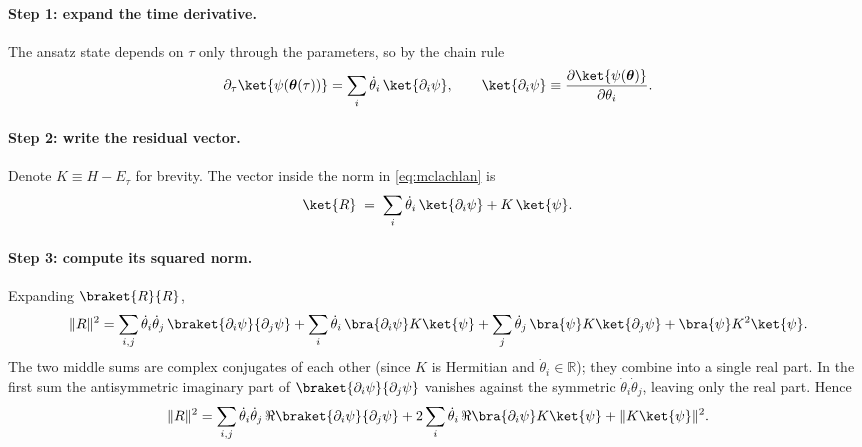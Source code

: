 \paragraph{Step 1: expand the time derivative.}
The ansatz state depends on $\tau$ only through the parameters, so by
the chain rule
\begin{equation}
  \label{eq:dtau_psi}
  \partial_\tau\ket{\psi(\bm{\theta}(\tau))}
  = \sum_i \dot{\theta}_i\,\ket{\partial_i\psi},
  \qquad
  \ket{\partial_i\psi} \equiv \frac{\partial\ket{\psi(\bm{\theta})}}
                                   {\partial\theta_i}.
\end{equation}

\paragraph{Step 2: write the residual vector.}
Denote $K \equiv H - E_\tau$ for brevity. The vector inside the norm in
\cref{eq:mclachlan} is
\begin{equation}
  \label{eq:residual}
  \ket{R} \;=\; \sum_i \dot{\theta}_i\,\ket{\partial_i\psi}
                + K\,\ket{\psi}.
\end{equation}

\paragraph{Step 3: compute its squared norm.}
Expanding $\braket{R}{R}$,
\begin{equation*}
  \|R\|^{2} =
    \sum_{i,j}\dot{\theta}_i\dot{\theta}_j\,
       \braket{\partial_i\psi}{\partial_j\psi}
    + \sum_i \dot{\theta}_i\,\bra{\partial_i\psi}K\ket{\psi}
    + \sum_j \dot{\theta}_j\,\bra{\psi}K\ket{\partial_j\psi}
    + \bra{\psi}K^{2}\ket{\psi}.
\end{equation*}
The two middle sums are complex conjugates of each other (since $K$ is
Hermitian and $\dot{\theta}_i\in\mathbb{R}$); they combine into a single
real part. In the first sum the antisymmetric imaginary part of
$\braket{\partial_i\psi}{\partial_j\psi}$ vanishes against the symmetric
$\dot{\theta}_i\dot{\theta}_j$, leaving only the real part. Hence
\begin{equation}
  \label{eq:residual_norm}
  \|R\|^{2} =
    \sum_{i,j}\dot{\theta}_i\dot{\theta}_j\,
      \Re\braket{\partial_i\psi}{\partial_j\psi}
    + 2\sum_i \dot{\theta}_i\,
      \Re\bra{\partial_i\psi}K\ket{\psi}
    + \|K\ket{\psi}\|^{2}.
\end{equation}

